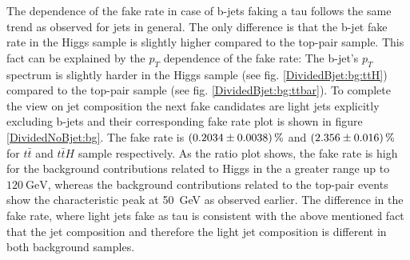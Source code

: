 %
The dependence of the fake rate in case of b-jets faking a tau follows the same trend as observed for jets in general. The only difference is that the b-jet fake rate in the Higgs sample is slightly higher compared to the top-pair sample. This fact can be explained by the $p_T$ dependence of the fake rate: The b-jet's $p_T$ spectrum is slightly harder in the Higgs sample (see fig. \ref{DividedBjet:bg:ttH}) compared to the top-pair sample (see fig. \ref{DividedBjet:bg:ttbar}).
To complete the view on jet composition the next fake candidates are light jets explicitly excluding b-jets and their corresponding fake rate plot is shown in figure \ref{DividedNoBjet:bg}. The fake rate is $\SI{0.2034\pm 0.0038}{\percent}$ and $\SI{2.356\pm 0.016}{\percent}$ for $t\bar{t}$ and $t\bar{t}H$ sample respectively. As the ratio plot shows, the fake rate is high for the background contributions related to Higgs in the a greater range up to $\SI{120}{\giga\electronvolt}$, whereas the background contributions related to the top-pair events show the characteristic peak at \SI{50}{\giga\electronvolt} as observed earlier. The difference in the fake rate, where light jets fake as tau is consistent with the above mentioned fact that the jet composition and therefore the light jet composition is different in both background samples.\par
%
